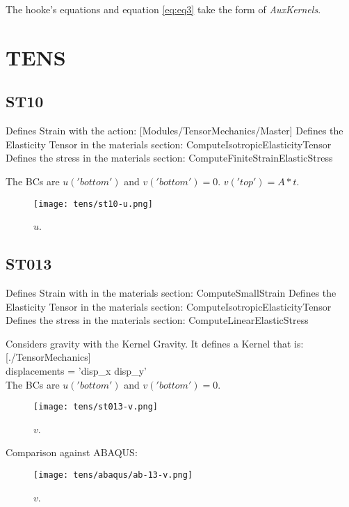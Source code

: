 \documentclass[11pt,letterpaper]{article}
\begin{document}
The hooke's equations and equation \ref{eq:eq3} take the form of \textit{AuxKernels}.

\section{TENS}

\subsection{ST10}

Defines Strain with the action: [Modules/TensorMechanics/Master]
Defines the Elasticity Tensor in the materials section: ComputeIsotropicElasticityTensor
Defines the stress in the materials section: ComputeFiniteStrainElasticStress

The BCs are $u('bottom')$ and $v('bottom') = 0$. $v('top')=A*t$.

\begin{figure}[H]
	\centering
	\texttt{[image: tens/st10-u.png]}
	\hfill
	\caption{$u$.}
	\label{fig:st10}
\end{figure}

\subsection{ST013}

Defines Strain with in the materials section: ComputeSmallStrain
Defines the Elasticity Tensor in the materials section: ComputeIsotropicElasticityTensor
Defines the stress in the materials section: ComputeLinearElasticStress

Considers gravity with the Kernel Gravity.
It defines a Kernel that is:
[./TensorMechanics]\\
 displacements = 'disp\_x disp\_y'\\

The BCs are $u('bottom')$ and $v('bottom') = 0$.

\begin{figure}[H]
	\centering
	\texttt{[image: tens/st013-v.png]}
	\hfill
	\caption{$v$.}
	\label{fig:st13}
\end{figure}

Comparison against ABAQUS:

\begin{figure}[H]
	\centering
	\texttt{[image: tens/abaqus/ab-13-v.png]}
	\hfill
	\caption{$v$.}
	\label{fig:st13ab}
\end{figure}
\end{document}
